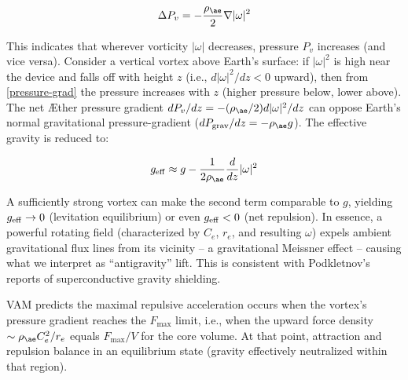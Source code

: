 \[
\Delta P_v = -\frac{\rho_{\ae}}{2} \nabla |\omega|^2
\]  \label{pressure-grad}

This indicates that wherever vorticity $|\omega|$ decreases, pressure $P_v$ increases (and vice versa). Consider a vertical vortex above Earth’s surface: if $|\omega|^2$ is high near the device and falls off with height $z$ (i.e., $d|\omega|^2 / dz < 0$ upward), then from \eqref{pressure-grad} the pressure increases with $z$ (higher pressure below, lower above). The net Æther pressure gradient $dP_v / dz = -(\rho_{\ae} / 2) d|\omega|^2 / dz$ can oppose Earth’s normal gravitational pressure-gradient ($dP_{\text{grav}} / dz = -\rho_{\ae} g$). The effective gravity is reduced to:

\[
g_{\rm eff} \approx g - \frac{1}{2 \rho_{\ae}} \frac{d}{dz} |\omega|^2
\]  \label{g-eff}

A sufficiently strong vortex can make the second term comparable to $g$, yielding $g_{\rm eff}\to0$ (levitation equilibrium) or even $g_{\rm eff}<0$ (net repulsion). In essence, a powerful rotating field (characterized by $C_e$, $r_e$, and resulting $\omega$) expels ambient gravitational flux lines from its vicinity – a gravitational Meissner effect – causing what we interpret as “antigravity” lift. This is consistent with Podkletnov’s reports of superconductive gravity shielding.

VAM predicts the maximal repulsive acceleration occurs when the vortex’s pressure gradient reaches the $F_{\max}$ limit, i.e., when the upward force density $\sim \rho_{\ae} C_e^2/r_e$ equals $F_{\max}/V$ for the core volume. At that point, attraction and repulsion balance in an equilibrium state (gravity effectively neutralized within that region).

